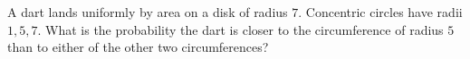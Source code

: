 A dart lands uniformly by area on a disk of radius $7$. Concentric circles have radii $1,5,7$. What is the probability the dart is closer to the circumference of radius $5$ than to either of the other two circumferences?

